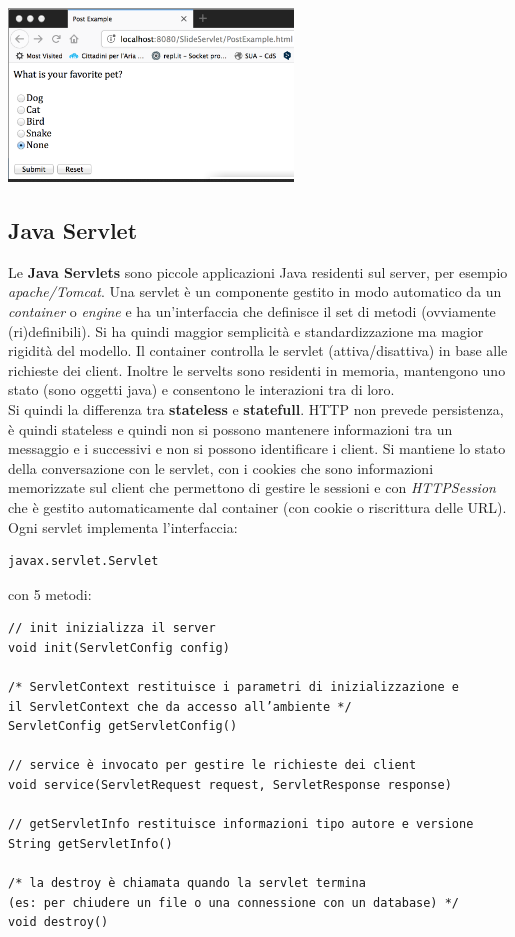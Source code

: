 \documentclass[a4paper,12pt, oneside]{book}
\begin{document}
\begin{center}
	\includegraphics[scale=0.7]{img/form.png}
\end{center}
\subsection{Java Servlet}
Le \textbf{Java Servlets} sono piccole applicazioni Java residenti sul server, per esempio \textit{apache/Tomcat}. Una servlet è un componente gestito in modo automatico da un \textit{container} o \textit{engine} e ha un'interfaccia che definisce il set di metodi (ovviamente (ri)definibili). Si ha quindi maggior semplicità e standardizzazione ma magior rigidità del modello. Il container controlla le servlet (attiva/disattiva) in base alle richieste dei client. Inoltre le servelts sono residenti in memoria, mantengono uno stato (sono oggetti java) e consentono le interazioni tra di loro.\\
Si quindi la differenza tra \textbf{stateless} e \textbf{statefull}. HTTP non prevede persistenza, è quindi stateless e quindi non si possono mantenere informazioni tra un messaggio e i successivi e non si possono identificare i client. Si mantiene lo stato della conversazione con le servlet, con i cookies che sono informazioni memorizzate sul client che permettono di gestire le sessioni e con \textit{HTTPSession} che è gestito automaticamente dal container (con cookie o riscrittura delle URL).\\
Ogni servlet implementa l'interfaccia:
\begin{verbatim}
javax.servlet.Servlet
\end{verbatim}
con 5 metodi:
\begin{verbatim}
// init inizializza il server
void init(ServletConfig config) 

/* ServletContext restituisce i parametri di inizializzazione e 
il ServletContext che da accesso all’ambiente */
ServletConfig getServletConfig() 

// service è invocato per gestire le richieste dei client
void service(ServletRequest request, ServletResponse response) 

// getServletInfo restituisce informazioni tipo autore e versione 
String getServletInfo() 

/* la destroy è chiamata quando la servlet termina 
(es: per chiudere un file o una connessione con un database) */
void destroy()  
\end{verbatim}
\end{document}
